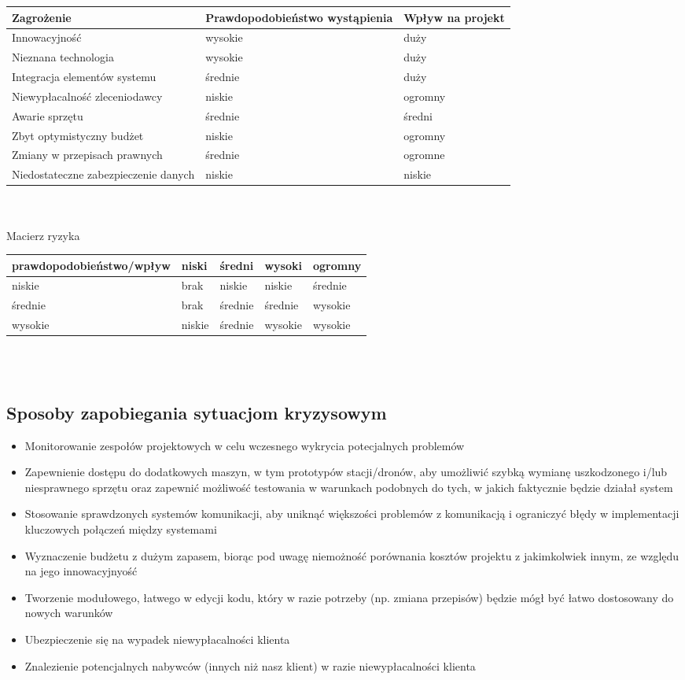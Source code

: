 \documentclass[12pt]{article}
\begin{document}
\begin{tabular}{|p{6.5cm}|p{4.5cm}|p{4.5cm}|} \hline
Zagrożenie & Prawdopodobieństwo wystąpienia & Wpływ na projekt \\
\hline \hline
Innowacyjność & wysokie & duży\\
\hline
Nieznana technologia & wysokie & duży\\
\hline
Integracja elementów systemu & średnie & duży\\
\hline
Niewypłacalność zleceniodawcy & niskie & ogromny\\
\hline
Awarie sprzętu & średnie & średni\\
\hline
Zbyt optymistyczny budżet & niskie & ogromny\\
\hline
Zmiany w przepisach prawnych & średnie & ogromne\\
\hline
Niedostateczne zabezpieczenie danych & niskie & niskie\\
\hline
\end{tabular}
\\\\
Macierz ryzyka
\\
\begin{tabular}{|p{6.8cm}|p{2cm}|p{2cm}|p{2cm}|p{2cm}|} \hline
prawdopodobieństwo/wpływ & niski & średni & wysoki & ogromny\\
\hline
niskie & brak & niskie & niskie & średnie\\
\hline
średnie & brak & średnie & średnie & wysokie\\
\hline
wysokie & niskie & średnie & wysokie & wysokie\\
\hline
\end{tabular}
\\\\
\subsection{Sposoby zapobiegania sytuacjom kryzysowym}
\begin{itemize}
\item Monitorowanie zespołów projektowych w celu wczesnego wykrycia potecjalnych problemów 
\item Zapewnienie dostępu do dodatkowych maszyn, w tym prototypów stacji/dronów, aby umożliwić szybką wymianę uszkodzonego i/lub niesprawnego sprzętu oraz zapewnić możliwość testowania w warunkach podobnych do tych, w jakich faktycznie będzie działał system
\item Stosowanie sprawdzonych systemów komunikacji, aby uniknąć większości problemów z komunikacją i ograniczyć błędy w implementacji kluczowych połączeń między systemami
\item Wyznaczenie budżetu z dużym zapasem, biorąc pod uwagę niemożność porównania kosztów projektu z jakimkolwiek innym, ze względu na jego innowacyjnyość
\item Tworzenie modułowego, łatwego w edycji kodu, który w razie potrzeby (np. zmiana przepisów) będzie mógł być łatwo dostosowany do nowych warunków
\item Ubezpieczenie się na wypadek niewypłacalności klienta
\item Znalezienie potencjalnych nabywców (innych niż nasz klient) w razie niewypłacalności klienta
\end{itemize}
\end{document}
